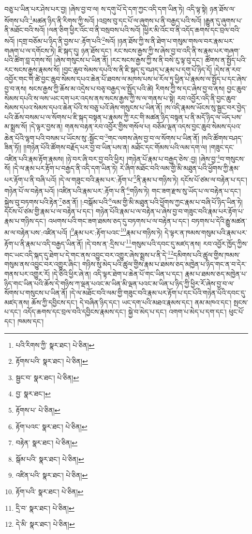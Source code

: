 བཅུ་པ་ཡིན་པར་ཤེས་པར་བྱ། །ཞེས་བྱ་བ་ལ། ས་དགུ་པོ་དེ་དག་ཀྱང་འདི་དག་ཡིན་ཏེ། འདི་ལྟ་སྟེ། ཉན་ཐོས་ལ་སོགས་པའི་\footnote{པའི་རིགས་ཀྱི་  སྣར་ཐང་།  པེ་ཅིན། }མཚན་ཉིད་ནི་རིགས་ཀྱི་སའོ། །འབྲས་བུ་དང་པོ་ལ་ཞུགས་པ་ནི་བརྒྱད་པའི་སའོ། །རྒྱུན་དུ་ཞུགས་པ་ནི་མཐོང་བའི་སའོ། །ལན་ཅིག་ཕྱིར་འོང་བ་ནི་བསྲབས་པའི་སའོ། །ཕྱིར་མི་འོང་བ་ནི་འདོད་ཆགས་དང་བྲལ་བའི་སའོ། །དགྲ་བཅོམ་པ་ཉིད་ནི་བྱས་པ་:རྟོག་པའི་\footnote{རྟོགས་པའི་  སྣར་ཐང་།  པེ་ཅིན། }སའོ། །ཉན་ཐོས་ཀྱི་ས་ནི་ཐེག་པ་གསུམ་གསལ་བར་རྣམ་པར་གཞག་པ་ལ་དགོངས་ཏེ། ཇི་སྐད་དུ། ཉན་ཐོས་དང་། རང་སངས་རྒྱས་ཀྱི་ས་ཞེས་བྱ་བ་འདི་ནི་ས་རྣམ་པར་གཞག་པའི་ཚིག་བླ་དགས་སོ། །ཞེས་གསུངས་པ་ཡིན་ནོ། །རང་སངས་རྒྱས་ཀྱི་ས་ནི་བསེ་རུ་ལྟ་བུ་དང་། ཚོགས་ན་སྤྱོད་པའི་རང་སངས་རྒྱས་རྣམས་སོ། །བྱང་ཆུབ་སེམས་དཔའི་ས་ནི་ཇི་སྐད་དུ་བཤད་པ་རྣམ་པ་དགུ་པོ་ཉིད་དོ། །དེས་ན་རབ་འབྱོར་གང་གི་ཚེ་བྱང་ཆུབ་སེམས་དཔའ་ཆེན་པོ་ཐབས་ལ་མཁས་པས་ཕ་རོལ་ཏུ་ཕྱིན་པ་རྣམས་ལ་སྤྱོད་པ་དང་ཞེས་བྱ་བ་ནས། སངས་རྒྱས་ཀྱི་ཆོས་མ་འདྲེས་པ་བཅྭ་བརྒྱད་ལ་སྤྱོད་པའི་ཚེ། རིགས་ཀྱི་ས་དང་ཞེས་བྱ་བ་ནས། བྱང་ཆུབ་སེམས་དཔའི་ས་ལས་ཡང་དག་པར་འདས་ནས་སངས་རྒྱས་ཀྱི་ས་ལ་གནས་པ་སྟེ། རབ་འབྱོར་འདི་ནི་བྱང་ཆུབ་སེམས་དཔའ་སེམས་དཔའ་ཆེན་པོའི་ས་བཅུ་པའོ་ཞེས་གསུངས་པ་ཡིན་ནོ། །ས་འདི་རྣམས་ཡོངས་སུ་སྦྱང་བར་བྱེད་པའི་ཆོས་བསམ་པ་ལ་སོགས་པ་ཇི་སྐད་བསྟན་པ་རྣམས་ཀྱི་རང་གི་མཚན་ཉིད་བསྟན་པ་ནི་མདོ་ཉིད་ལ་ཡོད་པས་མ་སྨྲས་སོ། །དེ་ལྟར་བྱས་ན། གནས་བརྟན་རབ་འབྱོར་གྱིས་གསོལ་པ། བཅོམ་ལྡན་འདས་བྱང་ཆུབ་སེམས་དཔའ་ཆེན་པོའི་ལྷག་པའི་བསམ་པ་ཡོངས་སུ་:སྦྱོང་བ་\footnote{སྦྱང་བ་  སྣར་ཐང་།  པེ་ཅིན། }གང་ལགས་ཞེས་བྱ་བ་ལ་སོགས་པ་ཡིན་ནོ། །སའི་ཚོགས་བཤད་ཟིན་ཏོ།། །།གཉེན་པོའི་ཚོགས་བརྗོད་པར་བྱ་བ་ཡིན་པས་ན། མཐོང་དང་གོམས་པའི་ལམ་དག་ལ། །གཟུང་དང་འཛིན་པའི་རྣམ་རྟོག་རྣམས། །ཉེ་བར་ཞི་བར་བྱ་བའི་ཕྱིར། །གཉེན་པོ་རྣམ་པ་བརྒྱད་ཅེས་:བྱ། །ཞེས་བྱ་\footnote{བྱ་  སྣར་ཐང་། }བ་གསུངས་སོ། །དེ་ལ་རྣམ་པར་རྟོག་པ་བརྒྱད་ནི་འདི་དག་ཡིན་ཏེ། རེ་ཞིག་མཐོང་བའི་ལམ་གྱི་མི་མཐུན་པའི་ཕྱོགས་ཀྱི་རྣམ་པར་རྟོག་པ་ནི་བཞི་པའོ། །དེ་ལ་གཟུང་བའི་རྣམ་པར་:རྟོག་པ་\footnote{རྟོགས་པ་  པེ་ཅིན། }ནི་རྣམ་པ་གཉིས་ཏེ། དངོས་པོ་ཙམ་ལ་བརྟེན་པ་དང་། གཉེན་པོ་ལ་བརྟེན་པའོ། །འཛིན་པའི་རྣམ་པར་:རྟོག་པ་ནི་\footnote{རྟོག་པའང་  སྣར་ཐང་།  པེ་ཅིན། }གཉིས་ཏེ། གང་ཟག་རྫས་སུ་ཡོད་པ་ལ་བརྟེན་པ་དང་། སྐྱེས་བུ་བཏགས་པའི་རྟེན་\footnote{བརྟེན་  སྣར་ཐང་།  པེ་ཅིན། }ཅན་ནོ། །:བསྒོམ་པའི་\footnote{སྒོམ་པའི་  སྣར་ཐང་།  པེ་ཅིན། }ལམ་གྱི་མི་མཐུན་པའི་ཕྱོགས་ཀྱང་རྣམ་པ་བཞི་པོ་ཉིད་ཡིན་ཏེ། དངོས་པོ་ཙམ་གྱི་རྣམ་པ་ལ་བརྟེན་པ་དང་། གཉེན་པོའི་རྣམ་པ་ལ་བརྟེན་པ་ཞེས་བྱ་བ་གཟུང་བའི་རྣམ་པར་རྟོག་པ་རྣམ་པ་གཉིས་དང་། འཕགས་པའི་གང་ཟག་ཐམས་ཅད་དུ་བཏགས་པ་ལ་བརྟེན་པ་དང་། བཏགས་པ་དེའི་རྒྱུ་མཚན་མ་ལ་བརྟེན་པས་:འཛིན་པའོ། །\footnote{འཛིན་པའི་  སྣར་ཐང་།  པེ་ཅིན། }རྣམ་པར་:རྟོག་པའང་\footnote{རྟོག་པའི་  སྣར་ཐང་།  པེ་ཅིན། }རྣམ་པ་གཉིས་ཏེ། དེ་ལྟར་ན་ཁམས་གསུམ་པའི་རྣམ་པར་རྟོག་པ་ནི་རྣམ་པ་འདི་བརྒྱད་ཡིན་ནོ། །དེ་བས་ན་:དྲིས་པ་\footnote{དྲི་བ་  སྣར་ཐང་།  པེ་ཅིན། }གསུམ་པའི་དབང་དུ་མཛད་ནས། རབ་འབྱོར་ཁྱོད་ཀྱིས་གང་ཡང་འདི་སྐད་དུ་ཐེག་པ་དེ་གང་ནས་འབྱུང་བར་འགྱུར་ཞེས་སྨྲས་པ་ནི་དེ་\footnote{དེ་མི་  སྣར་ཐང་།  པེ་ཅིན། }དམིགས་པའི་ཚུལ་གྱིས་ཁམས་གསུམ་ནས་འབྱུང་བར་འགྱུར་ཞིང་། གཉིས་སུ་མེད་པའི་ཚུལ་གྱིས་རྣམ་པ་ཐམས་ཅད་མཁྱེན་པ་ཉིད་གང་ན་བ་དེར་གནས་པར་འགྱུར་རོ། །དེ་ཅིའི་ཕྱིར་ཞེ་ན། འདི་ལྟར་ཐེག་པ་ཆེན་པོ་གང་ཡིན་པ་དང་། རྣམ་པ་ཐམས་ཅད་མཁྱེན་པ་ཉིད་གང་ཡིན་པའི་ཆོས་དེ་གཉིས་ཀ་ལྡན་པའང་མ་ཡིན་མི་ལྡན་པའང་མ་ཡིན་པ་ཉིད་ཀྱི་ཕྱིར་རོ་ཞེས་བྱ་བ་ལ་སོགས་པ་གསུངས་པ་ཡིན་ནོ། །དེ་ལ་མཐོང་བའི་ལམ་གྱི་གཟུང་བའི་རྣམ་པར་རྟོག་པ་དང་པོའི་གཉེན་པོའི་དབང་དུ་མཛད་ནས། ཆོས་ཀྱི་དབྱིངས་དང་། དེ་བཞིན་ཉིད་དང་། ཡང་དག་པའི་མཐའ་རྣམས་དང་། ནམ་མཁའ་དང་། སྤངས་པ་དང་། འདོད་ཆགས་དང་བྲལ་བའི་དབྱིངས་རྣམས་དང་། སྐྱེ་བ་མེད་པ་དང་། འགག་པ་མེད་པ་དག་དང་། ཕུང་པོ་དང་། ཁམས་དང་། 